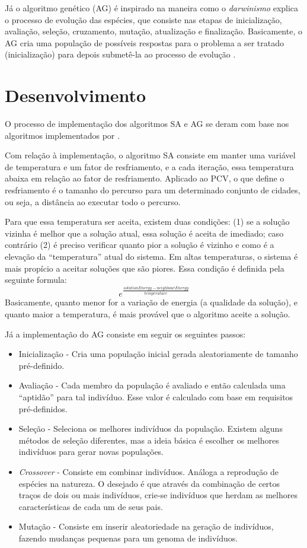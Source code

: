 \documentclass[journal, a4paper]{IEEEtran}
\begin{document}
    Já o algoritmo genético (AG) é inspirado na maneira como o \textit{darwinismo} explica o processo de evolução das espécies, que consiste nas etapas de inicialização, avaliação, seleção, cruzamento, mutação, atualização e finalização. Basicamente, o AG cria uma população de possíveis respostas para o problema a ser tratado (inicialização) para depois submetê-la ao processo de evolução \cite{diogo}.

\section{Desenvolvimento}
	O processo de implementação dos algoritmos SA e AG se deram com base nos algoritmos implementados por \cite{lee}.

    Com relação à implementação, o algoritmo SA consiste em manter uma variável de temperatura e um fator de resfriamento, e a cada iteração, essa temperatura abaixa em relação ao fator de resfriamento. Aplicado ao PCV, o que define o resfriamento é o tamanho do percurso para um determinado conjunto de cidades, ou seja, a distância ao executar todo o percurso.

    Para que essa temperatura ser aceita, existem duas condições: (1) se a solução vizinha é melhor que a solução atual, essa solução é aceita de imediado; caso contrário (2) é preciso verificar quanto pior a solução é vizinho e como é a elevação da ``temperatura'' atual do sistema. Em altas temperaturas, o sistema é mais propício a aceitar soluções que são piores. Essa condição é definida pela seguinte formula:
    \begin{equation}
		e^{\frac{solutionEnergy - neighbourEnergy}{temperature}}
	\end{equation}
    Basicamente, quanto menor for a variação de energia (a qualidade da solução), e quanto maior a temperatura, é mais provável que o algoritmo aceite a solução.

    Já a implementação do AG consiste em seguir os seguintes passos:
    \begin{itemize}
    \item Inicialização - Cria uma população inicial gerada aleatoriamente de tamanho pré-definido.
	\item Avaliação - Cada membro da população é avaliado e então calculada uma ``aptidão'' para tal indivíduo. Esse valor é calculado com base em requisitos pré-definidos.
	\item Seleção - Seleciona os melhores indivíduos da população. Existem alguns métodos de seleção diferentes, mas a ideia básica é escolher os melhores indivíduos para gerar novas populações.
	\item \textit{Crossover} - Consiste em combinar indivíduos. Análoga a reprodução de espécies na natureza. O desejado é que através da combinação de certos traços de dois ou mais indivíduos, crie-se indivíduos que herdam as melhores características de cada um de seus pais.
	\item Mutação - Consiste em inserir aleatoriedade na geração de indivíduos, fazendo mudanças pequenas para um genoma de indivíduos.
	\end{itemize}
\end{document}

